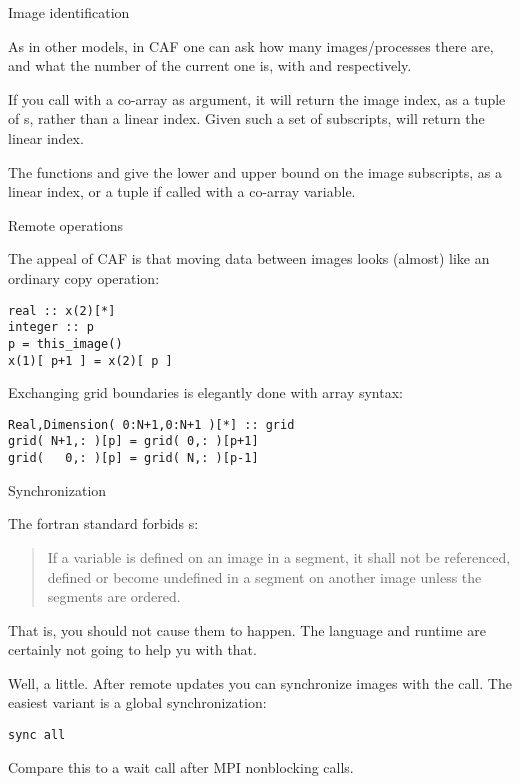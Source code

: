  {Image identification}

As in other models, in \ac{CAF} one can ask how many images/processes there are,
and what the number of the current one is,
with  and  respectively.


If you call  with a co-array as argument,
it will return the image index, as a tuple of s,
rather than a linear index.
Given such a set of subscripts, 
will return the linear index.

The functions  and 
give the lower and upper bound on the image subscripts,
as a linear index, or a tuple if called with a co-array variable.

 {Remote operations}

The appeal of \ac{CAF} is that moving data between images
looks (almost) like an ordinary copy operation:
\begin{lstlisting}
real :: x(2)[*]
integer :: p
p = this_image()
x(1)[ p+1 ] = x(2)[ p ]
\end{lstlisting}

Exchanging grid boundaries is elegantly done with array syntax:
\begin{lstlisting}
Real,Dimension( 0:N+1,0:N+1 )[*] :: grid
grid( N+1,: )[p] = grid( 0,: )[p+1]
grid(   0,: )[p] = grid( N,: )[p-1]
\end{lstlisting}

 {Synchronization}

The fortran standard forbids s:
\begin{quote}
  If a variable is defined on an image in a segment, it shall not be
  referenced, defined or become undefined in a segment on another
  image unless the segments are ordered.
\end{quote}
That is, you should not cause them to happen. The language and runtime
are certainly not going to help yu with that.

Well, a little. After remote updates you can synchronize images
with the  call.
The easiest variant is a global synchronization:
\begin{lstlisting}
sync all
\end{lstlisting}
Compare this to a wait call after MPI nonblocking calls.

